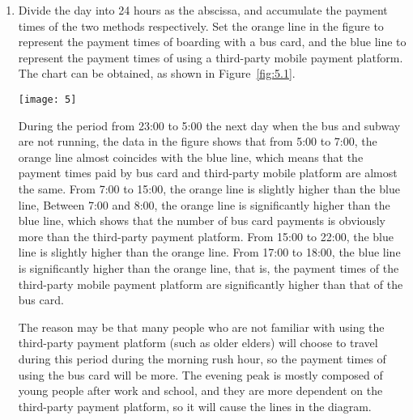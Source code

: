 \documentclass[../mcmpaper]{subfiles}
\begin{document}
\begin{enumerate}[label=\arabic*., format=\bfseries, itemindent=0pt, leftmargin=0pt, topsep=0pt, listparindent=\parindent, itemsep=1pt]
    \item Divide the day into 24 hours as the abscissa, and accumulate the payment times of the two methods respectively. Set the orange line in the figure to represent the payment times of boarding with a bus card, and the blue line to represent the payment times of using a third-party mobile payment platform. The chart can be obtained, as shown in Figure~\ref{fig:5.1}.\\
\begin{minipage}{1.0\linewidth}
\centering
\texttt{[image: 5]}
\label{fig:5.1}
\end{minipage}
\par
During the period from 23:00 to 5:00 the next day when the bus and subway are not running, the data in the figure shows that from 5:00 to 7:00, the orange line almost coincides with the blue line, which means that the payment times paid by bus card and third-party mobile platform are almost the same. From 7:00 to 15:00, the orange line is slightly higher than the blue line, Between 7:00 and 8:00, the orange line is significantly higher than the blue line, which shows that the number of bus card payments is obviously more than the third-party payment platform. From 15:00 to 22:00, the blue line is slightly higher than the orange line. From 17:00 to 18:00, the blue line is significantly higher than the orange line, that is, the payment times of the third-party mobile payment platform are significantly higher than that of the bus card.
\par
The reason may be that many people who are not familiar with using the third-party payment platform (such as older elders) will choose to travel during this period during the morning rush hour, so the payment times of using the bus card will be more. The evening peak is mostly composed of young people after work and school, and they are more dependent on the third-party payment platform, so it will cause the lines in the diagram.

\end{enumerate}
\end{document}
